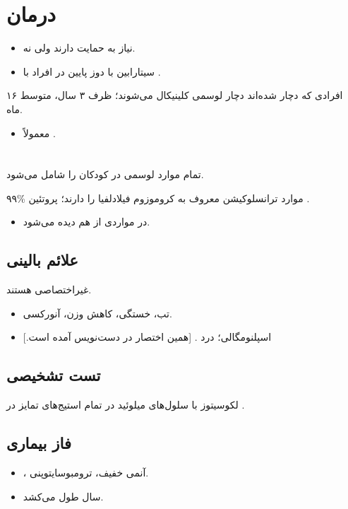\documentclass[12pt,a4paper]{article}
\begin{document}
\section*{درمان }
\begin{itemize}
\item نیاز به حمایت دارند ولی  نه.
\item سیتارابین با دوز پایین در افراد با .
\end{itemize}
 افرادی که دچار  شده‌اند دچار لوسمی کلینیکال می‌شوند؛ ظرف ۳ سال، متوسط ۱۶ ماه.
\begin{itemize}
\item معمولاً .
\end{itemize}
\section*{}
 تمام موارد لوسمی در کودکان را شامل می‌شود.

۹۹\% موارد  ترانسلوکیشن  معروف به کروموزوم فیلادلفیا را دارند؛ پروتئین .
\begin{itemize}
\item در مواردی از  هم دیده می‌شود.
\end{itemize}
\subsection*{علائم بالینی }
غیراختصاصی هستند.
\begin{itemize}
\item تب، خستگی، کاهش وزن، آنورکسی.
\item اسپلنومگالی؛ درد . [همین اختصار در دست‌نویس آمده است.]
\end{itemize}
\subsection*{تست تشخیصی}
لکوسیتوز با سلول‌های میلوئید در تمام استیج‌های تمایز در .
\subsection*{فاز  بیماری}
\begin{itemize}
\item {}، آنمی خفیف، ترومبوسایتوپنی.
\item {} سال طول می‌کشد.
\end{itemize}
\end{document}

